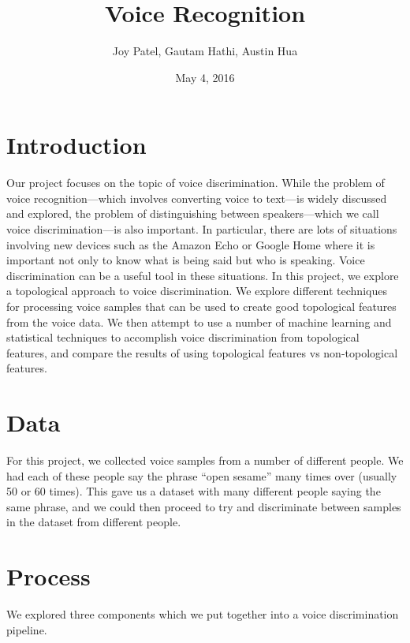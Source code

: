 \documentclass[12pt]{article}
\title{Voice Recognition}
\author{Joy Patel, Gautam Hathi, Austin Hua}
\date{May 4, 2016}
\begin{document}
\maketitle

\newpage
\tableofcontents

\newpage
\section{Introduction}
\-\hspace{1cm} Our project focuses on the topic of voice discrimination. While
the problem of voice recognition—which involves converting voice to text—is widely discussed
and explored, the problem of distinguishing between speakers—which we call
voice discrimination—is also important. In particular, there are lots of
situations involving new devices such as the Amazon Echo or Google Home where
it is important not only to know what is being said but who is speaking. Voice
discrimination can be a useful tool in these situations.
\newline \-\hspace{1cm}In this project, we explore a topological approach to
voice discrimination. We explore different techniques for processing voice
samples that can be used to create good topological features from the voice
data. We then attempt to use a number of machine learning and statistical
techniques to accomplish voice discrimination from topological features, and
compare the results of using topological features vs non-topological features.

\section{Data}
\-\hspace{1cm} For this project, we collected voice samples from a number of
different people. We had each of these people say the phrase “open sesame” many
times over (usually 50 or 60 times). This gave us a dataset with many different
people saying the same phrase, and we could then proceed to try and
discriminate between samples in the dataset from different people.

\section{Process}
\-\hspace{1cm} We explored three components which we put together into a voice
discrimination pipeline.
\end{document}
